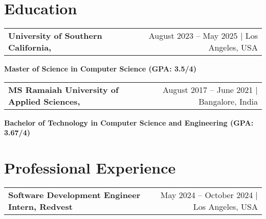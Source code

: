 \documentclass[10pt, legalpaper]{article}
\newenvironment{onecolentry}{
    \par\noindent
}{
    \par
}
\begin{document}


\section{Education}

\begin{tabularx}{\textwidth}{@{}Xr@{}}
    \textbf{University of Southern California,} & August 2023 – May 2025 | Los Angeles, USA \\
\end{tabularx}
\vspace{-4.5mm}
\begin{onecolentry}

    \textbf{Master of Science in Computer Science (GPA: 3.5/4)}
\end{onecolentry}

\vspace{0.1 cm}


\begin{tabularx}{\textwidth}{@{}Xr@{}}
    \textbf{MS Ramaiah University of Applied Sciences,} & August 2017 – June 2021 | Bangalore, India \\
\end{tabularx}
\vspace{-4.5mm}
\begin{onecolentry}

\textbf{Bachelor of Technology in Computer Science and Engineering (GPA: 3.67/4)}
\end{onecolentry}

\section{Professional Experience}

\begin{tabularx}{\textwidth}{@{}Xr@{}}
    \textbf{Software Development Engineer Intern, Redvest} & May 2024 – October 2024 | Los Angeles, USA \\
\end{tabularx}
\vspace{-5mm}
\end{document}
